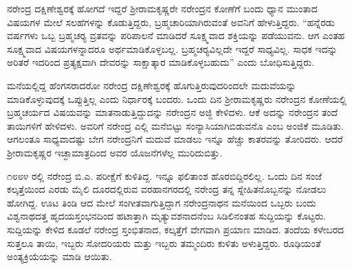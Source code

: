 ನರೇಂದ್ರ ದಕ್ಷಿಣೇಶ್ವರಕ್ಕೆ ಹೋಗದೆ ಇದ್ದರೆ ಶ‍್ರೀರಾಮಕೃಷ್ಣರೇ ನರೇಂದ್ರನ ಕೋಣೆಗೆ ಬಂದು ಧ್ಯಾನ ಮುಂತಾದ ವಿಷಯಗಳ ಮೇಲೆ ಸಲಹೆಗಳನ್ನು ಕೊಡುತ್ತಿದ್ದರು, ಬ್ರಹ್ಮಚಾರಿಯಾಗಿರುವಂತೆ ಅವನಿಗೆ ಹೇಳುತ್ತಿದ್ದರು. “ಹನ್ನೆರಡು ವರ್ಷಗಳು ಒಬ್ಬ ಬ್ರಹ್ಮಚರ‍್ಯ ವ್ರತವನ್ನು ಪರಿಪಾಲನೆ ಮಾಡಿದರೆ ಸೂಕ್ಷ್ಮವಾದ ಶಕ್ತಿಯನ್ನು ಪಡೆಯುವನು. ಆಗ ಎಂತಹ ಸೂಕ್ಷ್ಮವಾದ ವಿಷಯಗಳನ್ನಾದರೂ ಅರ್ಥಮಾಡಿಕೊಳ್ಳಬಲ್ಲ. ಬ್ರಹ್ಮಚರ‍್ಯವಿಲ್ಲದೇ ಇದ್ದರೆ ಸಾಧ್ಯವಿಲ್ಲ. ಸಾಧಕ ಇದನ್ನು ಅರಿತರೆ ಇದರಿಂದ ಪ್ರತ್ಯಕ್ಷವಾಗಿ ದೇವರನ್ನು ಸಾಕ್ಷಾತ್ಕಾರ ಮಾಡಿಕೊಳ್ಳಬಹುದು” ಎಂದು ಬೋಧಿಸುತ್ತಿದ್ದರು.

ಮನೆಯಲ್ಲಿದ್ದ ಹೆಂಗಸರಾದರೋ ನರೇಂದ್ರ ದಕ್ಷಿಣೇಶ್ವರಕ್ಕೆ ಹೊಗುತ್ತಿರುವುದರಿಂದಲೇ ಮದುವೆಯನ್ನು ಮಾಡಿಕೊಳ್ಳುವುದಕ್ಕೆ ಒಪ್ಪುತ್ತಿಲ್ಲ ಎಂದು ನಿರ್ಧಾರಕ್ಕೆ ಬಂದರು. ಒಂದು ದಿನ ಶ‍್ರೀರಾಮಕೃಷ್ಣರು ನರೇಂದ್ರನ ಕೋಣೆಯಲ್ಲಿ ಬ್ರಹ್ಮಚರ್ಯದ ವಿಷಯವನ್ನು ಮಾತನಾಡುತ್ತಿದ್ದುದನ್ನು ನರೇಂದ್ರನ ಅಜ್ಜಿ ಕೇಳಿದಳು. ಆಕೆ ಅದನ್ನು ನರೇಂದ್ರನ ತಂದೆ ತಾಯಿಗಳಿಗೆ ಹೇಳಿದಳು. ಅವರಿಗೆ ನರೇಂದ್ರ ಎಲ್ಲಿ ಮನೆಬಿಟ್ಟು ಸಂನ್ಯಾಸಿಯಾಗಿಬಿಡುವನೊ ಎಂಬ ಅಂಜಿಕೆ ಮೂಡಿತು. ಆಗಲಂತೂ ಸಾಧ್ಯವಾದಷ್ಟು ಬೇಗ ನರೇಂದ್ರನಿಗೆ ಮದುವೆ ಮಾಡಲು ಇನ್ನೂ ಹೆಚ್ಚು ಕಾತರವನ್ನು ತೋರಿದರು. ಆದರೆ ಶ‍್ರೀರಾಮಕೃಷ್ಣರ ಇಚ್ಛಾಮಾತ್ರದಿಂದ ಅವರ ಯೊಜನೆಗಳೆಲ್ಲ ಮುರಿದುಬಿತ್ತು.

೧೮೮೪ ರಲ್ಲಿ ನರೇಂದ್ರ ಬಿ.ಎ. ಪರೀಕ್ಷೆಗೆ ಕುಳಿತಿದ್ದ. ಇನ್ನೂ ಫಲಿತಾಂಶ ಹೊರಬಿದ್ದಿರಲಿಲ್ಲ. ಒಂದು ದಿನ ಸಂಜೆ ಕಲ್ಕತ್ತೆಯಿಂದ ಎರಡು ಮೈಲಿ ದೂರದಲ್ಲಿರುವ ವರಹಾನಗರದಲ್ಲಿ ನರೇಂದ್ರ ತನ್ನ ಸ್ನೇಹಿತನೊಬ್ಬನನ್ನು ನೋಡಲು ಹೋಗಿದ್ದ. ಊಟ ತಿಂಡಿ ಆದ ಮೇಲೆ ಸಂಗೀತವಾಗುತ್ತಿದ್ದಾಗ ನರೇಂದ್ರನಾಥನ ಮನೆಯಿಂದ ಒಬ್ಬರು ಬಂದು ವಿಶ್ವನಾಥದತ್ತ ಹೃದಯಸ್ತಂಭನದಿಂದ ಹಟಾತ್ತಾಗಿ ಮೃತ್ಯುವಶನಾದನೆಂಬ ಸಿಡಿಲಿನಂತಹ ಸುದ್ದಿಯನ್ನು ಕೊಟ್ಟರು. ಸುದ್ದಿಯನ್ನು ಕೇಳಿದ ಕೂಡಲೆ ನರೇಂದ್ರ ಸ್ತಂಭಿತನಾದ, ಕಲ್ಕತ್ತೆಗೆ ವೇಗವಾಗಿ ಪ್ರಯಾಣ ಮಾಡಿದ. ತಂದೆಯ ಕಳೇಬರದ ಸುತ್ತಲೂ ತಾಯಿ, ಇಬ್ಬರು ಸೋದರಿಯರು ಮತ್ತು ಇಬ್ಬರು ತಮ್ಮಂದಿರು ಕುಳಿತು ಅಳುತ್ತಿದ್ದರು. ರೂಢಿಯಂತೆ ಅಂತ್ಯಕ್ರಿಯೆಯನ್ನು ಮಾಡಿ ಆಯಿತು.

